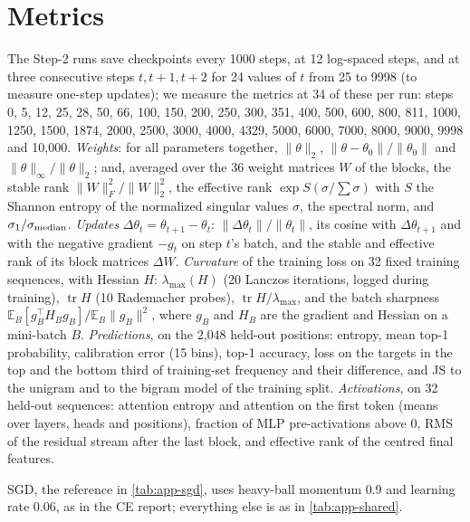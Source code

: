 \section{Metrics}
\label{app:metrics}

The Step-2 runs save checkpoints every 1000 steps, at 12 log-spaced steps, and at three consecutive steps $t,t+1,t+2$
for 24 values of $t$ from 25 to 9998 (to measure one-step updates); we measure the metrics at 34 of these per run: steps 0, 5, 12, 25, 28, 50, 66,
100, 150, 200, 250, 300, 351, 400, 500, 600, 800, 811, 1000, 1250, 1500, 1874, 2000, 2500, 3000, 4000, 4329, 5000,
6000, 7000, 8000, 9000, 9998 and 10{,}000.
\emph{Weights}: for all parameters together, $\|\theta\|_2$, $\|\theta-\theta_0\|/\|\theta_0\|$ and
$\|\theta\|_\infty/\|\theta\|_2$; and, averaged over the 36 weight matrices $W$ of the blocks, the stable rank
$\|W\|_F^2/\|W\|_2^2$, the effective rank $\exp S(\sigma/\textstyle\sum\sigma)$ with $S$ the Shannon entropy of the normalized
singular values $\sigma$, the spectral norm, and $\sigma_1/\sigma_{\rm median}$. \emph{Updates}
$\Delta\theta_t=\theta_{t+1}-\theta_t$: $\|\Delta\theta_t\|/\|\theta_t\|$, its cosine with $\Delta\theta_{t+1}$ and with
the negative gradient $-g_t$ on step $t$'s batch, and the stable and effective rank of its block matrices $\Delta W$.
\emph{Curvature} of the training loss on 32 fixed training sequences, with Hessian $H$: $\lambda_{\max}(H)$ (20 Lanczos
iterations, logged during training), $\operatorname{tr}H$ (10 Rademacher probes), $\operatorname{tr}H/\lambda_{\max}$,
and the batch sharpness $\mathbb{E}_B[g_B^\top H_Bg_B]/\mathbb{E}_B\|g_B\|^2$, where $g_B$ and $H_B$ are the gradient
and Hessian on a mini-batch $B$. \emph{Predictions}, on the 2{,}048 held-out positions: entropy, mean top-1 probability,
calibration error (15 bins), top-1 accuracy, loss on the targets in the top and the bottom third of training-set
frequency and their difference, and JS to the unigram and to the bigram model of the training split.
\emph{Activations}, on 32 held-out sequences: attention entropy and attention on the first token (means over layers,
heads and positions), fraction of MLP pre-activations above 0, RMS of the residual stream after the last block, and
effective rank of the centred final features.

SGD, the reference in \cref{tab:app-sgd}, uses heavy-ball momentum 0.9 and learning rate 0.06, as in the CE report;
everything else is as in \cref{tab:app-shared}.

